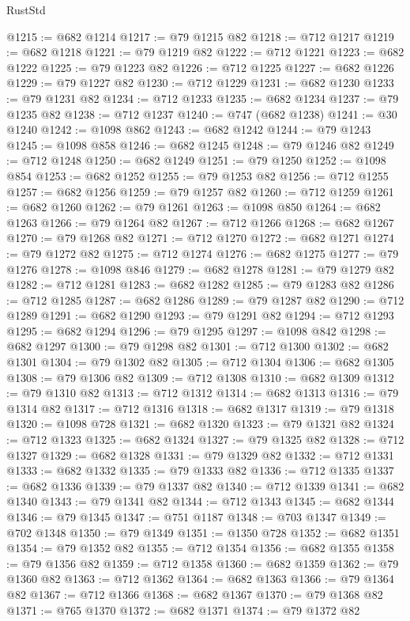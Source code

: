 \begin{lexlean}{RustStd}
\begin{coremodule}
@1215 := @682 @1214
@1217 := @79 @1215 @82
@1218 := @712 @1217
@1219 := @682 @1218
@1221 := @79 @1219 @82
@1222 := @712 @1221
@1223 := @682 @1222
@1225 := @79 @1223 @82
@1226 := @712 @1225
@1227 := @682 @1226
@1229 := @79 @1227 @82
@1230 := @712 @1229
@1231 := @682 @1230
@1233 := @79 @1231 @82
@1234 := @712 @1233
@1235 := @682 @1234
@1237 := @79 @1235 @82
@1238 := @712 @1237
@1240 := @747 (@682 @1238)
@1241 := @30 @1240
@1242 := @1098 @862
@1243 := @682 @1242
@1244 := @79 @1243
@1245 := @1098 @858
@1246 := @682 @1245
@1248 := @79 @1246 @82
@1249 := @712 @1248
@1250 := @682 @1249
@1251 := @79 @1250
@1252 := @1098 @854
@1253 := @682 @1252
@1255 := @79 @1253 @82
@1256 := @712 @1255
@1257 := @682 @1256
@1259 := @79 @1257 @82
@1260 := @712 @1259
@1261 := @682 @1260
@1262 := @79 @1261
@1263 := @1098 @850
@1264 := @682 @1263
@1266 := @79 @1264 @82
@1267 := @712 @1266
@1268 := @682 @1267
@1270 := @79 @1268 @82
@1271 := @712 @1270
@1272 := @682 @1271
@1274 := @79 @1272 @82
@1275 := @712 @1274
@1276 := @682 @1275
@1277 := @79 @1276
@1278 := @1098 @846
@1279 := @682 @1278
@1281 := @79 @1279 @82
@1282 := @712 @1281
@1283 := @682 @1282
@1285 := @79 @1283 @82
@1286 := @712 @1285
@1287 := @682 @1286
@1289 := @79 @1287 @82
@1290 := @712 @1289
@1291 := @682 @1290
@1293 := @79 @1291 @82
@1294 := @712 @1293
@1295 := @682 @1294
@1296 := @79 @1295
@1297 := @1098 @842
@1298 := @682 @1297
@1300 := @79 @1298 @82
@1301 := @712 @1300
@1302 := @682 @1301
@1304 := @79 @1302 @82
@1305 := @712 @1304
@1306 := @682 @1305
@1308 := @79 @1306 @82
@1309 := @712 @1308
@1310 := @682 @1309
@1312 := @79 @1310 @82
@1313 := @712 @1312
@1314 := @682 @1313
@1316 := @79 @1314 @82
@1317 := @712 @1316
@1318 := @682 @1317
@1319 := @79 @1318
@1320 := @1098 @728
@1321 := @682 @1320
@1323 := @79 @1321 @82
@1324 := @712 @1323
@1325 := @682 @1324
@1327 := @79 @1325 @82
@1328 := @712 @1327
@1329 := @682 @1328
@1331 := @79 @1329 @82
@1332 := @712 @1331
@1333 := @682 @1332
@1335 := @79 @1333 @82
@1336 := @712 @1335
@1337 := @682 @1336
@1339 := @79 @1337 @82
@1340 := @712 @1339
@1341 := @682 @1340
@1343 := @79 @1341 @82
@1344 := @712 @1343
@1345 := @682 @1344
@1346 := @79 @1345
@1347 := @751 @1187
@1348 := @703 @1347
@1349 := @702 @1348
@1350 := @79 @1349
@1351 := @1350 @728
@1352 := @682 @1351
@1354 := @79 @1352 @82
@1355 := @712 @1354
@1356 := @682 @1355
@1358 := @79 @1356 @82
@1359 := @712 @1358
@1360 := @682 @1359
@1362 := @79 @1360 @82
@1363 := @712 @1362
@1364 := @682 @1363
@1366 := @79 @1364 @82
@1367 := @712 @1366
@1368 := @682 @1367
@1370 := @79 @1368 @82
@1371 := @765 @1370
@1372 := @682 @1371
@1374 := @79 @1372 @82

\end{coremodule}
\end{lexlean}
